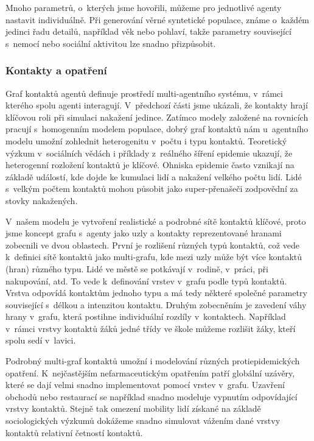 Mnoho parametrů, o~kterých jsme hovořili, můžeme pro jednotlivé agenty nastavit individuálně. Při generování věrné syntetické populace, známe o~každém jedinci řadu detailů, například věk nebo pohlaví, takže parametry související s~nemocí nebo sociální aktivitou lze snadno přizpůsobit. 




\subsubsection*{Kontakty a opatření}

Graf kontaktů agentů definuje prostředí multi-agentního systému, v~rámci kterého spolu agenti interagují. V~předchozí části jsme ukázali, že kontakty hrají klíčovou roli při simulaci nakažení jedince. Zatímco modely založené na rovnicích pracují s~homogenním modelem populace, dobrý graf kontaktů nám u~agentního modelu umožní zohlednit heterogenitu v~počtu i typu kontaktů. Teoretický výzkum v~sociálních vědách i příklady z~reálného šíření epidemie ukazují, že heterogenní rozložení kontaktů je klíčové. Ohniska epidemie často vznikají na základě  událostí, kde dojde ke kumulaci lidí a nakažení velkého počtu lidí. Lidé s~velkým počtem kontaktů mohou působit jako super-přenašeči zodpovědní za stovky nakažených.  

V~našem modelu je vytvoření realistické a podrobné sítě kontaktů klíčové, proto jsme koncept grafu s~agenty jako uzly a kontakty reprezentované hranami zobecnili ve dvou oblastech. První je rozlišení různých typů kontaktů, což vede k~definici sítě kontaktů jako multi-grafu, kde mezi uzly může být více kontaktů (hran) různého typu. Lidé ve městě se potkávají v~rodině, v~práci, při nakupování, atd. To vede k~definování vrstev v~grafu podle typů kontaktů. Vrstva odpovídá kontaktům jednoho typu a má tedy některé společné parametry související s~délkou a intenzitou kontaktu. Druhým zobecněním je zavedení váhy hrany v~grafu, která postihne individuální rozdíly v~kontaktech. Například v~rámci vrstvy kontaktů žáků jedné třídy ve škole můžeme rozlišit žáky, kteří spolu sedí v~lavici. 

Podrobný multi-graf kontaktů umožní i modelování různých protiepidemických opatření. K~nejčastějším nefarmaceutickým opatřením patří globální uzávěry, které se dají velmi snadno implementovat pomocí vrstev v~grafu. Uzavření obchodů nebo restaurací se například snadno modeluje vypnutím odpovídající vrstvy kontaktů. Stejně tak omezení mobility lidí získané na základě sociologických výzkumů dokážeme snadno simulovat vážením dané vrstvy kontaktů relativní četností kontaktů.

